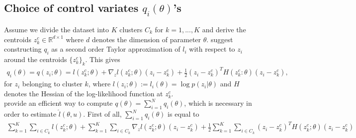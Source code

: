 \documentclass[11pt,a4paper]{report}\usepackage[]{graphicx}\usepackage[]{color}
\begin{document}
\subsection{Choice of control variates $q_i(\theta)$'s}
Assume we divide the dataset into $K$ clusters $C_k$ for $k=1,...,K$ and derive the centroids $z_k^c\in\mathbb R^{d\times 1}$ where $d$ denotes the dimension of parameter $\theta$.
\cite{quiroz2018speeding} suggest constructing $q_i$ as a second order Taylor approximation of $l_i$ with respect to $z_i$ around the centroids $\{z_k^c\}_k$. This gives
\begin{align}
\label{eq:quiroz9}
q_i(\theta)=q(z_i;\theta)=l(z^c_k;\theta)+\nabla_z l(z^c_k;\theta)(z_i-z^c_k)+\frac12 (z_i-z^c_k)^TH(z^c_k:\theta)(z_i-z^c_k),
\end{align}
for $z_i$ belonging to cluster $k$, where $l(z_i;\theta):=l_i(\theta)=\log p(z_i|\theta)$ and $H$ denotes the Hessian of the log-likelihood function at $z^c_k$.\\
\cite{quiroz2018speeding} provide an efficient way to compute $q(\theta)=\sum_{i=1}^N q_i(\theta)$, which is necessary in order to estimate $\hat l(\theta,u)$. First of all, $\sum_{i=1}^N q_i(\theta)$ is equal to
\begin{align}
\label{eq:quiroz10}
\sum_{k=1}^K\sum_{i\in C_k}l(z^c_k;\theta)+\sum_{k=1}^K\sum_{i\in C_k}\nabla_z l(z^c_k;\theta)(z_i-z^c_k)+\frac12\sum_{k=1}^K\sum_{i\in C_k}(z_i-z^c_k)^TH(z^c_k;\theta)(z_i-z^c_k)
\end{align}
\end{document}
